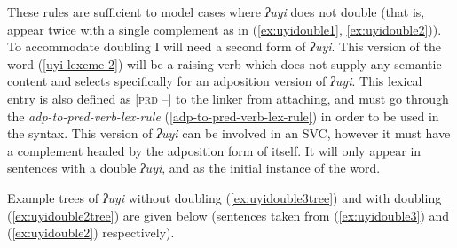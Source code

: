 These rules are sufficient to model cases where \textit{ʔuyi} does not double (that is, appear twice with a single complement as in (\ref{ex:uyidouble1}, \ref{ex:uyidouble2})). To accommodate doubling I will need a second form of \textit{ʔuyi}. This version of the word (\ref{uyi-lexeme-2}) will be a raising verb which does not supply any semantic content and selects specifically for an adposition version of \textit{ʔuyi}. This lexical entry is also defined as [\textsc{prd} --] to the linker from attaching, and must go through the {\textit{adp-to-pred-verb-lex-rule}} (\ref{adp-to-pred-verb-lex-rule}) in order to be used in the syntax. This version of \textit{ʔuyi} can be involved in an SVC, however it must have a complement headed by the adposition form of itself. It will only appear in sentences with a double \textit{ʔuyi}, and as the initial instance of the word.

\begin{singlespacing}
\ex \label{uyi-lexeme-2}
\xe 
\end{singlespacing}

Example trees of \textit{ʔuyi} without doubling (\ref{ex:uyidouble3tree}) and with doubling (\ref{ex:uyidouble2tree}) are given below (sentences taken from (\ref{ex:uyidouble3}) and (\ref{ex:uyidouble2}) respectively).

